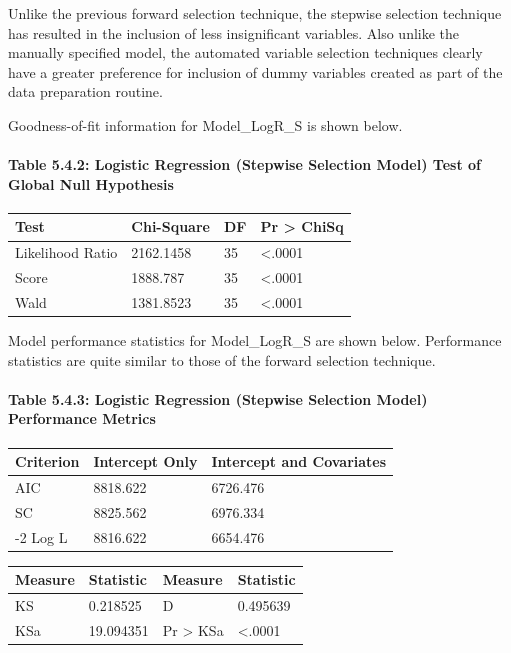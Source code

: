 \documentclass[]{article}
\let\oldparagraph\paragraph
\renewcommand{\paragraph}[1]{\oldparagraph{#1}\mbox{}}
\begin{document}
Unlike the previous forward selection technique, the stepwise selection
technique has resulted in the inclusion of less insignificant variables.
Also unlike the manually specified model, the automated variable
selection techniques clearly have a greater preference for inclusion of
dummy variables created as part of the data preparation routine.

Goodness-of-fit information for Model\_LogR\_S is shown below.

\paragraph{Table 5.4.2: Logistic Regression (Stepwise Selection Model)
Test of Global Null
Hypothesis}\label{table-5.4.2-logistic-regression-stepwise-selection-model-test-of-global-null-hypothesis}

\begin{longtable}[]{@{}llll@{}}
\toprule
Test & Chi-Square & DF & Pr \textgreater{} ChiSq\tabularnewline
\midrule
\endhead
Likelihood Ratio & 2162.1458 & 35 & \textless{}.0001\tabularnewline
Score & 1888.787 & 35 & \textless{}.0001\tabularnewline
Wald & 1381.8523 & 35 & \textless{}.0001\tabularnewline
\bottomrule
\end{longtable}

Model performance statistics for Model\_LogR\_S are shown below.
Performance statistics are quite similar to those of the forward
selection technique.

\paragraph{Table 5.4.3: Logistic Regression (Stepwise Selection Model)
Performance
Metrics}\label{table-5.4.3-logistic-regression-stepwise-selection-model-performance-metrics}

\begin{longtable}[]{@{}lll@{}}
\toprule
Criterion & Intercept Only & Intercept and Covariates\tabularnewline
\midrule
\endhead
AIC & 8818.622 & 6726.476\tabularnewline
SC & 8825.562 & 6976.334\tabularnewline
-2 Log L & 8816.622 & 6654.476\tabularnewline
\bottomrule
\end{longtable}

\begin{longtable}[]{@{}llll@{}}
\toprule
Measure & Statistic & Measure & Statistic\tabularnewline
\midrule
\endhead
KS & 0.218525 & D & 0.495639\tabularnewline
KSa & 19.094351 & Pr \textgreater{} KSa &
\textless{}.0001\tabularnewline
\bottomrule
\end{longtable}
\end{document}
